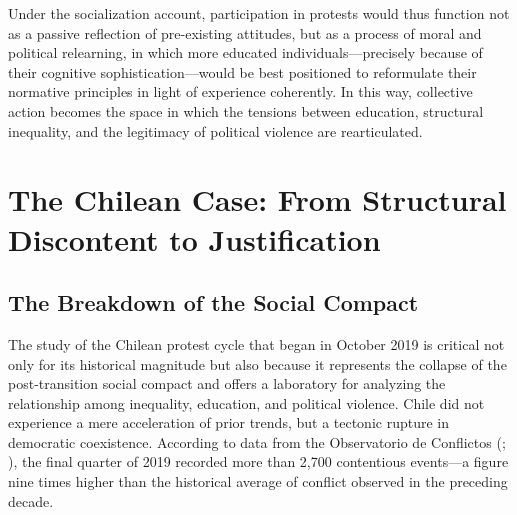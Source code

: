 \documentclass[
  13pt,
]{article}
\begin{document}
Under the socialization account, participation in protests would thus
function not as a passive reflection of pre-existing attitudes, but as a
process of moral and political relearning, in which more educated
individuals---precisely because of their cognitive
sophistication---would be best positioned to reformulate their normative
principles in light of experience coherently. In this way, collective
action becomes the space in which the tensions between education,
structural inequality, and the legitimacy of political violence are
rearticulated.

\section{The Chilean Case: From Structural Discontent to
Justification}\label{the-chilean-case-from-structural-discontent-to-justification}

\subsection{The Breakdown of the Social
Compact}\label{the-breakdown-of-the-social-compact}

The study of the Chilean protest cycle that began in October 2019 is
critical not only for its historical magnitude but also because it
represents the collapse of the post-transition social compact and offers
a laboratory for analyzing the relationship among inequality, education,
and political violence. Chile did not experience a mere acceleration of
prior trends, but a tectonic rupture in democratic coexistence.
According to data from the Observatorio de Conflictos
(;
), the final quarter of
2019 recorded more than 2,700 contentious events---a figure nine times
higher than the historical average of conflict observed in the preceding
decade.
\end{document}
